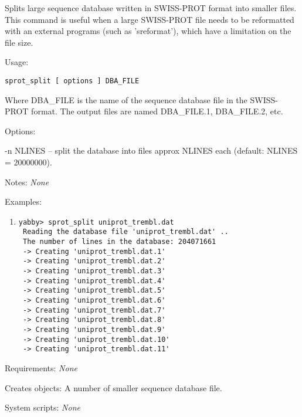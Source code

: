 Splits large sequence database written in SWISS-PROT format
into smaller files. This command is useful when a large SWISS-PROT
file needs to be reformatted with an external programs (such as
'sreformat'), which have a limitation on the file size. 


\begin{description}


\item{Usage:}

{\tt sprot\_split [ options ] DBA\_FILE}

 Where DBA\_FILE is the name of the sequence database file in
 the SWISS-PROT format. The output files are named DBA\_FILE.1,
 DBA\_FILE.2, etc.


\item{Options:}
\begin{description}
\item -n NLINES -- split the database into files approx NLINES
 each (default: NLINES = 20000000).
\end{description}


\item{Notes:} {\em None}


\item{Examples:}
\begin{enumerate}

\item
\begin{verbatim}
yabby> sprot_split uniprot_trembl.dat
 Reading the database file 'uniprot_trembl.dat' ..
 The number of lines in the database: 204071661
 -> Creating 'uniprot_trembl.dat.1'
 -> Creating 'uniprot_trembl.dat.2'
 -> Creating 'uniprot_trembl.dat.3'
 -> Creating 'uniprot_trembl.dat.4'
 -> Creating 'uniprot_trembl.dat.5'
 -> Creating 'uniprot_trembl.dat.6'
 -> Creating 'uniprot_trembl.dat.7'
 -> Creating 'uniprot_trembl.dat.8'
 -> Creating 'uniprot_trembl.dat.9'
 -> Creating 'uniprot_trembl.dat.10'
 -> Creating 'uniprot_trembl.dat.11'

\end{verbatim}

\end{enumerate}


\item{Requirements:} {\em None}


\item{Creates objects:} A number of smaller sequence database file.


\item{System scripts:} {\em None}

\end{description}


